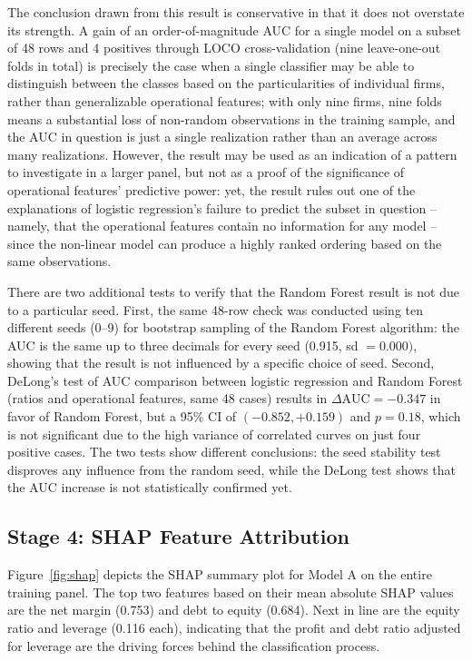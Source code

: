 \documentclass[final,1p,times]{elsarticle}
\begin{document}
The conclusion drawn from this result is conservative in that it does not overstate its strength. A gain of an order-of-magnitude AUC for a single model on a subset of 48 rows and 4 positives through LOCO cross-validation (nine leave-one-out folds in total) is precisely the case when a single classifier may be able to distinguish between the classes based on the particularities of individual firms, rather than generalizable operational features; with only nine firms, nine folds means a substantial loss of non-random observations in the training sample, and the AUC in question is just a single realization rather than an average across many realizations. However, the result may be used as an indication of a pattern to investigate in a larger panel, but not as a proof of the significance of operational features' predictive power: yet, the result rules out one of the explanations of logistic regression's failure to predict the subset in question -- namely, that the operational features contain no information for any model -- since the non-linear model can produce a highly ranked ordering based on the same observations.

There are two additional tests to verify that the Random Forest result is not due to a particular seed. First, the same 48-row check was conducted using ten different seeds (0--9) for bootstrap sampling of the Random Forest algorithm: the AUC is the same up to three decimals for every seed (0.915, sd $= 0.000)$, showing that the result is not influenced by a specific choice of seed. Second, DeLong's test of AUC comparison between logistic regression and Random Forest (ratios and operational features, same 48 cases) results in $\Delta\text{AUC} = -0.347$ in favor of Random Forest, but a 95\% CI of $(-0.852, +0.159)$ and $p = 0.18$, which is not significant due to the high variance of correlated curves on just four positive cases. The two tests show different conclusions: the seed stability test disproves any influence from the random seed, while the DeLong test shows that the AUC increase is not statistically confirmed yet.

\subsection{Stage 4: SHAP Feature Attribution}
\label{S:results-shap}

Figure~\ref{fig:shap} depicts the SHAP summary plot for Model A on the entire training panel. The top two features based on their mean absolute SHAP values are the net margin (0.753) and debt to equity (0.684). Next in line are the equity ratio and leverage (0.116 each), indicating that the profit and debt ratio adjusted for leverage are the driving forces behind the classification process.
\end{document}
